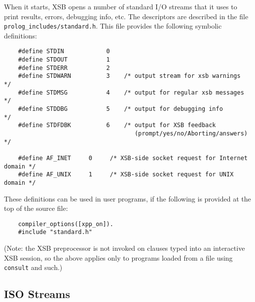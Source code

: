 When it starts, XSB opens a number of standard I/O streams that it
uses to print results, errors, debugging info, etc. The descriptors
are described in the file {\tt prolog\_includes/standard.h}. This file
provides the following symbolic definitions:
\begin{verbatim}
    #define STDIN            0
    #define STDOUT           1
    #define STDERR           2
    #define STDWARN          3    /* output stream for xsb warnings  */
    #define STDMSG           4    /* output for regular xsb messages */
    #define STDDBG           5    /* output for debugging info       */
    #define STDFDBK          6    /* output for XSB feedback
                                     (prompt/yes/no/Aborting/answers) */

    #define AF_INET     0     /* XSB-side socket request for Internet domain */
    #define AF_UNIX     1     /* XSB-side socket request for UNIX domain */
\end{verbatim}
These definitions can be used in user programs, if the following is
provided at the top of the source file:
\begin{verbatim}
    compiler_options([xpp_on]).
    #include "standard.h"
\end{verbatim}
(Note: the XSB preprocessor is not invoked on clauses typed into an
interactive XSB session, so the above applies only to programs loaded from
a file using {\tt consult} and such.)

\subsection{ISO Streams}

